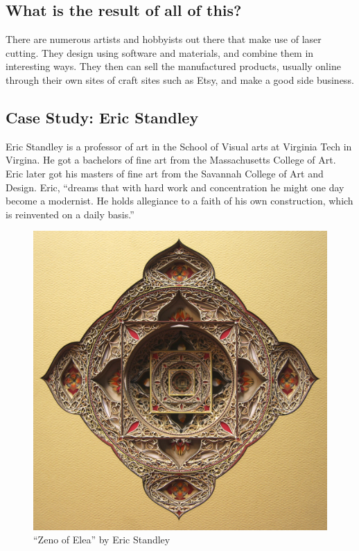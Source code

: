 \documentclass[12pt singlecol]{article}
\begin{document}
\begin{flushleft}
\section{What is the result of all of this?}

There are numerous artists and hobbyists out there that make use of laser cutting. They design using software and materials, and combine them in interesting ways. They then can sell the manufactured products, usually online through their own sites of craft sites such as Etsy, and make a good side business. \cite{etsy13}

\subsection{Case Study: Eric Standley}

Eric Standley is a professor of art in the School of Visual arts at Virginia Tech in Virgina. He got a bachelors of fine art from the Massachusetts College of Art. Eric later got his masters of fine art from the Savannah College of Art and Design. Eric, ``dreams that with hard work and concentration he might one day become a modernist. He holds allegiance to a faith of his own construction, which is reinvented on a daily basis.'' \cite{standley} 

\begin{figure}
  \centering  
  \includegraphics[width=\linewidth]{eric1}
  \caption{``Zeno of Elea'' by Eric Standley \cite{standley}}
  \label{fig:eric1}
\end{figure}	


\end{flushleft}
\end{document}
